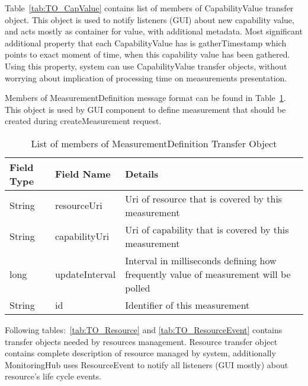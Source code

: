 Table~\ref{tab:TO_CapValue} contains list of members of CapabilityValue transfer object. This
object is used to notify listeners (GUI) about new capability value, and acts mostly as container for value, with
additional metadata. Most significant additional property that each CapabilityValue has is gatherTimestamp which points
to exact moment of time, when this capability value has been gathered. Using this property, system can use
CapabilityValue transfer objects, without worrying about implication of processing time on measurements presentation.

Members of MeasurementDefinition message format can be found in Table~\ref{tab:TO_MeasurementDef}. This object is used
by GUI component to define measurement that should be created during createMeasurement request.



\begin{table}[h] %
\begin{tabular}{| m{} | m{} | m{} |}
   \hline 
   \cellcolor[gray]{0.9} Field Type & \cellcolor[gray]{0.9} Field Name & \cellcolor[gray]{0.9} Details \\
   \hline 
   String  & resourceUri &  Uri of resource that is covered by this measurement \\
   String & capabilityUri & Uri of capability that is covered by this measurement \\
   long & updateInterval & Interval in milliseconds defining how frequently value of measurement will be polled \\
   String & id & Identifier of this measurement \\ 
   \hline 
\end{tabular}
 \caption{List of members of MeasurementDefinition Transfer Object}
 \label{tab:TO_MeasurementDef}
\end{table} %

Following tables:~\ref{tab:TO_Resource} and \ref{tab:TO_ResourceEvent} contains transfer objects needed by resources
management. Resource transfer object contains complete description of resource managed by system, additionally
MonitoringHub uses ResourceEvent to notify all listeners (GUI mostly) about resource's life cycle events.  

